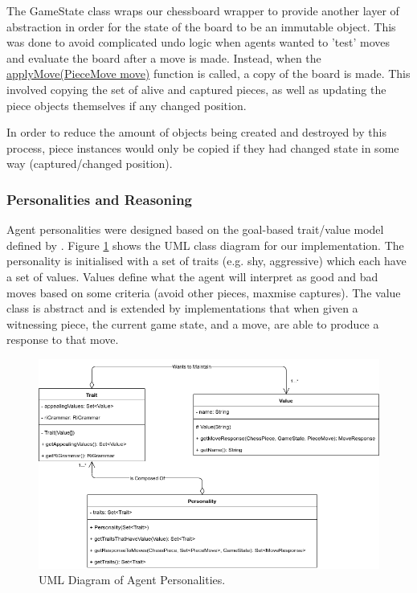\documentclass{article}
\begin{document}
The GameState class wraps our chessboard wrapper to provide another layer of abstraction in order for the state of the board to be an immutable object. This was done to avoid complicated undo logic when agents wanted to 'test' moves and evaluate the board after a move is made. Instead, when the \url{applyMove(PieceMove move)} function is called, a copy of the board is made. This involved copying the set of alive and captured pieces, as well as updating the piece objects themselves if any changed position. 

In order to reduce the amount of objects being created and destroyed by this process, piece instances would only be copied if they had changed state in some way (captured/changed position). 

\subsubsection{Personalities and Reasoning}

Agent personalities were designed based on the goal-based trait/value model defined by \cite{hetrogenousagents}. Figure \ref{fig:personalityuml} shows the UML class diagram for our implementation. The personality is initialised with a set of traits (e.g. shy, aggressive) which each have a set of values. Values define what the agent will interpret as good and bad moves based on some criteria (avoid other pieces, maxmise captures). The value class is abstract and is extended by implementations that when given a witnessing piece, the current game state, and a move, are able to produce a response to that move.

\begin{figure}[]
	\centering
	\includegraphics[width=0.8\linewidth]{images/personality}
	\caption{UML Diagram of Agent Personalities.}
	\label{fig:personalityuml}
\end{figure}
\end{document}
